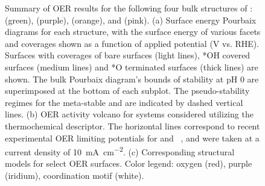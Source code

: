 \begin{figure}
\centering
{}
\caption{\label{fig:oer_volcano}
%
Summary of OER results for the following four bulk structures of \IrOx: \rIrOtwo (green), \aIrOthree (purple), \rIrOthree (orange), and \bIrOthree (pink).
%
(a) Surface energy Pourbaix diagrams for each structure, with the surface energy of various facets and coverages shown as a function of applied potential (V vs. RHE).
%
Surfaces with coverages of bare surfaces (light lines), *OH covered surfaces (medium lines) and *O terminated surfaces (thick lines) are shown.
%
The bulk Pourbaix diagram's bounds of stability at pH \num{0} are superimposed at the bottom of each subplot.
%
The pseudo-stability regimes for the meta-stable \bIrOthree and \rIrOthree are indicated by dashed vertical lines.
%
(b) OER activity volcano for \IrOx systems considered utilizing the \DGOmOH thermochemical descriptor.
%
The horizontal lines correspond to recent experimental OER limiting potentials for \IrOtwo and \IrOthree~\cite{Seitz2016}, and were taken at a current density of \SI[mode=text]{10}{\mA\per\cm\squared}.
%
(c) Corresponding structural models for select OER surfaces.
%
%
Color legend: oxygen (red), purple (iridium), coordination motif (white).
}
\end{figure}


